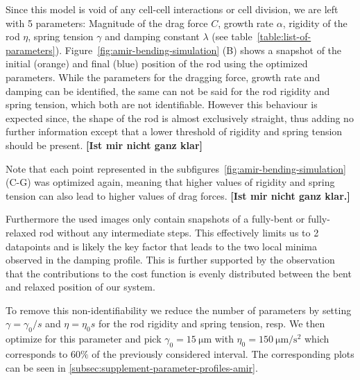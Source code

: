 \documentclass{article}
\begin{document}
Since this model is void of any cell-cell interactions or cell division, we are left with 5 parameters:
Magnitude of the drag force $C$, growth rate $\alpha$, rigidity of the rod $\eta$, spring tension
$\gamma$ and damping constant $\lambda$ (see table~\ref{table:list-of-parameters}).
Figure~\ref{fig:amir-bending-simulation} (B) shows a snapshot of the initial (orange) and final
(blue) position of the rod using the optimized parameters.
While the parameters for the dragging force, growth rate and damping can be identified, the same
can not be said for the rod rigidity and spring tension, which both are not identifiable.
However this behaviour is expected since, the shape of the rod is almost exclusively straight, thus
adding no further information except that a lower threshold of rigidity and spring tension should be
present.
\textbf{[Ist mir nicht ganz klar]}

Note that each point represented in the subfigures~\ref{fig:amir-bending-simulation} (C-G) was
optimized again, meaning that higher values of rigidity and spring tension can also lead to higher
values of drag forces.
\textbf{[Ist mir nicht ganz klar.]}

Furthermore the used images only contain snapshots of a fully-bent or fully-relaxed rod without any
intermediate steps.
This effectively limits us to 2 datapoints and is likely the key factor that leads to the two local
minima observed in the damping profile.
This is further supported by the observation that the contributions to the cost function is evenly
distributed between the bent and relaxed position of our system.

To remove this non-identifiability we reduce the number of parameters by setting $\gamma=\gamma_0/s$
and $\eta=\eta_0 s$ for the rod rigidity and spring tension, resp.
We then optimize for this parameter and pick $\gamma_0=\SI{15}{\micro\metre}$ with
$\eta_0=\SI{150}{\micro\metre\per\second\squared}$ which corresponds to $60\%$ of the previously considered
interval.
The corresponding plots can be seen in \ref{subsec:supplement-parameter-profiles-amir}.
\end{document}
